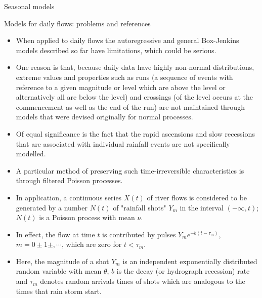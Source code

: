 \documentclass[8pt]{beamer}
\renewcommand{\emph}[1]{\textcolor{myorange}{#1}}
\begin{document}
\begin{frame}{Seasonal models}
    \begin{block}{Models for daily flows: problems and references}
    \end{block}
    \begin{itemize}
        \item When applied to \emph{daily flows}  the \emph{autoregressive} and general \emph{Box-Jenkins} models described so far have limitations, which could be serious. 
        \item One reason is that, because \emph{daily data} have highly \emph{non-normal distributions}, extreme values and properties such as \emph{runs} (a sequence of events with reference to a given magnitude or level which are above the level or alternatively all are below the level) and \emph{crossings} (of the level occurs at the commencement as well as the end of the run) are not maintained through models that were  devised originally for \emph{normal processes}. 
        \item Of equal significance is the fact that the \emph{rapid ascensions} and \emph{slow recessions} that are associated with individual rainfall events are not specifically modelled. 
        \item A particular method of preserving  such time-irreversible characteristics is through \emph{filtered Poisson processes}. 
        \item In application, a continuous series $X(t)$ of \emph{river flows} is considered to be generated by a number $N(t)$ of \emph{"rainfall shots"} $Y_m$ in the interval $(-\infty, t)$; $N(t)$ is a \emph{Poisson process} with mean $\nu$. 
        \item In effect, the flow at time $t$ is contributed by pulses $Y_m e^{-b(t-\tau_m)}$, $m=0\pm 1 \pm, \cdots$, which are zero for $t< \tau_m$.
    \item Here, the magnitude of a \emph{shot} $Y_m$ is an \emph{independent exponentially distributed} random variable with \emph{mean} $\theta$, $b$ is the \emph{decay (or hydrograph recession) rate} and $\tau_m$ denotes \emph{random arrivals times} of shots which are analogous to the times that \emph{rain storm start}.
    \end{itemize}
\end{frame}
\end{document}
